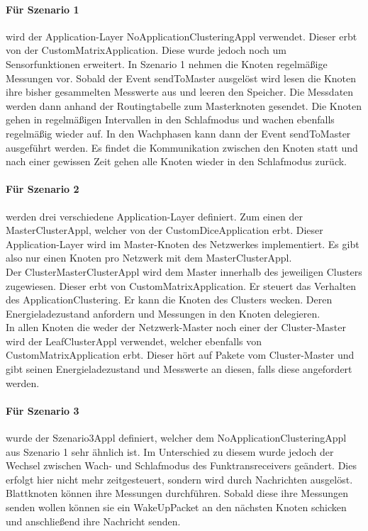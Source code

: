 \paragraph{Für Szenario 1} wird der Application-Layer NoApplicationClusteringAppl verwendet. Dieser erbt von der CustomMatrixApplication. Diese wurde jedoch noch um  Sensorfunktionen erweitert. In Szenario 1 nehmen die Knoten regelmäßige Messungen vor. Sobald der Event sendToMaster ausgelöst wird lesen die Knoten ihre bisher gesammelten Messwerte aus und leeren den Speicher. Die Messdaten werden dann anhand der Routingtabelle zum Masterknoten gesendet. Die Knoten gehen in regelmäßigen Intervallen in den Schlafmodus und wachen ebenfalls regelmäßig wieder auf. In den Wachphasen kann dann der Event sendToMaster ausgeführt werden. Es findet die Kommunikation zwischen den Knoten statt und nach einer gewissen Zeit gehen alle Knoten wieder in den Schlafmodus zurück.

\paragraph{Für Szenario 2} werden drei verschiedene Application-Layer definiert. Zum einen der MasterClusterAppl, welcher von der CustomDiceApplication erbt. Dieser Application-Layer wird im Master-Knoten des Netzwerkes implementiert. Es gibt also nur einen Knoten pro Netzwerk mit dem MasterClusterAppl.\\
Der ClusterMasterClusterAppl wird dem Master innerhalb des jeweiligen Clusters zugewiesen. Dieser erbt von CustomMatrixApplication. Er steuert das Verhalten des ApplicationClustering. Er kann die Knoten des Clusters wecken. Deren Energieladezustand anfordern und Messungen in den Knoten delegieren.\\
In allen Knoten die weder der Netzwerk-Master noch einer der Cluster-Master wird der LeafClusterAppl verwendet, welcher ebenfalls von CustomMatrixApplication erbt.   Dieser hört auf Pakete vom Cluster-Master und gibt seinen Energieladezustand und Messwerte an diesen, falls diese angefordert werden.

\paragraph{Für Szenario 3} wurde der Szenario3Appl definiert, welcher dem NoApplicationClusteringAppl aus Szenario 1 sehr ähnlich ist. Im Unterschied zu diesem wurde jedoch der Wechsel zwischen Wach- und Schlafmodus des Funktransreceivers geändert. Dies erfolgt hier nicht mehr zeitgesteuert, sondern wird durch Nachrichten ausgelöst.\\
Blattknoten können ihre Messungen durchführen. Sobald diese ihre Messungen senden wollen können sie ein WakeUpPacket an den nächsten Knoten schicken und anschließend ihre Nachricht senden.

